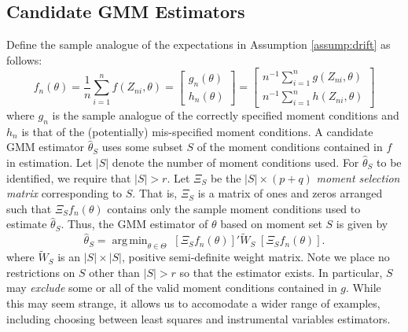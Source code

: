 \documentclass[12pt]{article}
\DeclareMathOperator*{\argmin}{arg\,min}
\theoremstyle{definition}
\begin{document}
\subsection{Candidate GMM Estimators}
Define the sample analogue of the expectations in Assumption \ref{assump:drift} as follows:
$$f_n(\theta) = \frac{1}{n}\sum_{i=1}^n f(Z_{ni},\theta) = \left[\begin{array}{c} g_n(\theta)\\ h_n(\theta) \end{array} \right]=\left[\begin{array}{c}n^{-1}\sum_{i=1}^n g(Z_{ni},\theta) \\ n^{-1}\sum_{i=1}^n h(Z_{ni},\theta) \end{array}\right]$$
where $g_n$ is the sample analogue of the correctly specified moment conditions and $h_n$ is that of the (potentially) mis-specified moment conditions. A candidate GMM estimator $\widehat{\theta}_S$ uses some subset $S$ of the moment conditions contained in $f$ in estimation. Let $|S|$ denote the number of moment conditions used. For $\widehat{\theta}_S$ to be identified, we require that $|S|>r$. Let $\Xi_S$ be the $|S| \times(p +q)$ \emph{moment selection matrix} corresponding to $S$. That is, $\Xi_S$ is a matrix of ones and zeros arranged such that $\Xi_S f_n(\theta)$ contains only the sample moment conditions used to estimate $\widehat{\theta}_S$. Thus, the GMM estimator of $\theta$ based on moment set $S$ is given by 
$$\widehat{\theta}_S = \argmin_{\theta \in \Theta}\; \left[\Xi_S f_n(\theta)\right]' \widetilde{W}_S \; \left[ \Xi_S f_n(\theta)\right].$$
where $\widetilde{W}_S$ is an $|S|\times |S|$, positive semi-definite weight matrix. Note we place no restrictions on $S$ other than $|S| >r$ so that the estimator exists. In particular, $S$ may \emph{exclude} some or all of the valid moment conditions contained in $g$. While this may seem strange, it allows us to accomodate a wider range of examples, including choosing between least squares and instrumental variables estimators.
\end{document}
